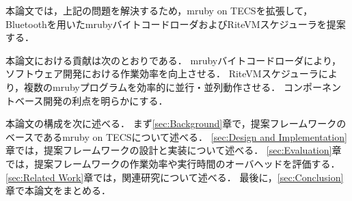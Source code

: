\documentclass[submit,techrep]{ipsj}
\begin{document}
本論文では，上記の問題を解決するため，mruby on TECSを拡張して，Bluetoothを用いたmrubyバイトコードローダおよびRiteVMスケジューラを提案する．

本論文における貢献は次のとおりである．
mrubyバイトコードローダにより，ソフトウェア開発における作業効率を向上させる．
RiteVMスケジューラにより，複数のmrubyプログラムを効率的に並行・並列動作させる．
コンポーネントベース開発の利点を明らかにする．

本論文の構成を次に述べる．
まず\ref{sec:Background}章で，提案フレームワークのベースであるmruby on TECSについて述べる．
\ref{sec:Design and Implementation}章では，提案フレームワークの設計と実装について述べる．
\ref{sec:Evaluation}章では，提案フレームワークの作業効率や実行時間のオーバヘッドを評価する．
\ref{sec:Related Work}章では，関連研究について述べる．
最後に，\ref{sec:Conclusion}章で本論文をまとめる．
\end{document}
